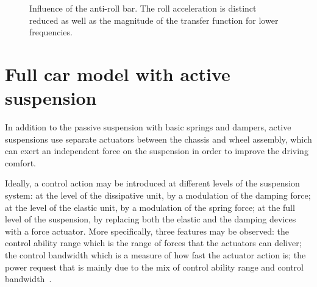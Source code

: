  \begin{figure}
 \centering
 \caption{Influence of the anti-roll bar. The roll acceleration is distinct reduced as well as the magnitude of the transfer function for lower frequencies.}
 \label{fig:anti_roll_bar}
 \end{figure}




\section{Full car model with active suspension}
\label{sec:active full car model}

In addition to the passive suspension with basic springs and dampers, active suspensions use separate actuators between the chassis and wheel assembly, which can exert an independent force on the suspension in order to improve the driving comfort.

Ideally, a control action may be introduced at different levels of the suspension system: at the level of the dissipative unit, by a modulation of the damping force; at the level of the elastic unit, by a modulation of the spring force; at the full level of the suspension, by replacing both the elastic and the damping devices with a force actuator.
%
More specifically, three features may be observed: the control ability range which is the range of forces that the actuators can deliver; the control bandwidth which is a measure of how fast the actuator action is; the power request that is mainly due to the mix of control ability range and control bandwidth~\cite{savaresi2010semi}.

